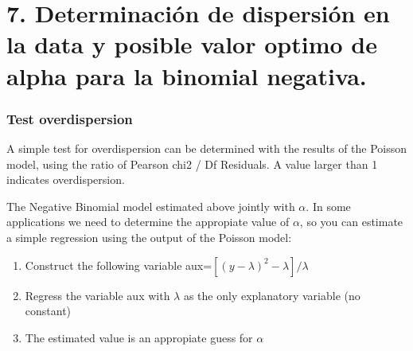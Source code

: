 \documentclass[11pt]{article}
\providecommand{\tightlist}{%
      \setlength{\itemsep}{0pt}\setlength{\parskip}{0pt}}
\begin{document}
    \section{7. Determinación de dispersión en la data y posible valor
optimo de alpha para la binomial
negativa.}\label{determinaciuxf3n-de-dispersiuxf3n-en-la-data-y-posible-valor-optimo-de-alpha-para-la-binomial-negativa.}

\subsubsection{Test overdispersion}\label{test-overdispersion}

A simple test for overdispersion can be determined with the results of
the Poisson model, using the ratio of Pearson chi2 / Df Residuals. A
value larger than 1 indicates overdispersion.

The Negative Binomial model estimated above jointly with \(\alpha\). In
some applications we need to determine the appropiate value of
\(\alpha\), so you can estimate a simple regression using the output of
the Poisson model:

\begin{enumerate}
\def\labelenumi{\arabic{enumi}.}
\tightlist
\item
  Construct the following variable
  aux=\([(y-\lambda)^2-\lambda]/\lambda\)
\item
  Regress the variable aux with \(\lambda\) as the only explanatory
  variable (no constant)
\item
  The estimated value is an appropiate guess for \(\alpha\)
\end{enumerate}
\end{document}
